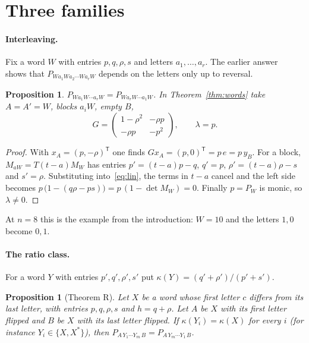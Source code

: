 \documentclass[11pt]{article}
\newtheorem{proposition}[theorem]{Proposition}
\theoremstyle{remark}
\newcommand{\T}{^{\mathsf T}}
\begin{document}
\section{Three families}

\paragraph{Interleaving.} Fix a word $W$ with entries $p,q,\rho,s$ and letters $a_1,\dots,a_r$. The earlier
answer~\cite{MOans} shows that $P_{Wa_1Wa_2\cdots Wa_rW}$ depends on the letters only up to reversal.

\begin{proposition}\label{prop:inter}
$P_{W a_1W\cdots a_rW}=P_{Wa_rW\cdots a_1W}$. In Theorem~\ref{thm:words} take $A=A'=W$, blocks $a_iW$, empty $B$,
\[
G=\begin{pmatrix}1-\rho^2&-\rho p\\-\rho p&-p^2\end{pmatrix},\qquad \lambda=p .
\]
\end{proposition}

\begin{proof}
With $x_A=(p,-\rho)\T$ one finds $Gx_A=(p,0)\T=p\,e=p\,y_B$. For a block, $M_{aW}=T(t-a)M_W$ has entries
$p'=(t-a)p-q$, $q'=p$, $\rho'=(t-a)\rho-s$ and $s'=\rho$. Substituting into~\eqref{eq:lin}, the terms in $t-a$ cancel
and the left side becomes $p\,\bigl(1-(q\rho-ps)\bigr)=p\,(1-\det M_W)=0$. Finally $p=P_W$ is monic, so
$\lambda\neq0$.
\end{proof}

At $n=8$ this is the example from the introduction: $W=10$ and the letters $1,0$ become $0,1$.

\paragraph{The ratio class.} For a word $Y$ with entries $p',q',\rho',s'$ put $\kappa(Y)=(q'+\rho')/(p'+s')$.

\begin{proposition}[Theorem R]\label{prop:R}
Let $X$ be a word whose first letter $c$ differs from its last letter, with entries $p,q,\rho,s$ and $h=q+\rho$. Let
$A$ be $X$ with its first letter flipped and $B$ be $X$ with its last letter flipped. If $\kappa(Y_i)=\kappa(X)$ for
every $i$ (for instance $Y_i\in\{X,X^*\}$), then $P_{A\,Y_1\cdots Y_m\,B}=P_{A\,Y_m\cdots Y_1\,B}$.
\end{proposition}
\end{document}
